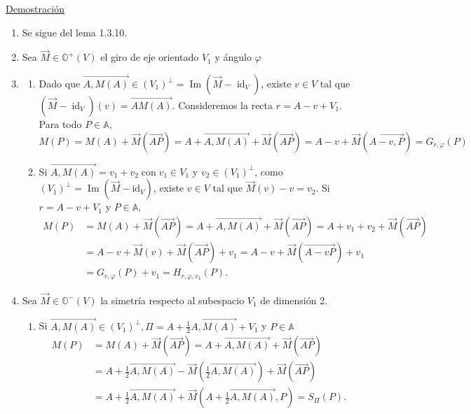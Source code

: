 \documentclass[12pt, a4paper, ones, notitlepage, openany,titlepage]{article}
\newcommand{\demostracion}{\noindent\underline{Demostración}}
\begin{document}
\demostracion
\begin{enumerate}[label=(\arabic*)]
\item Se sigue del lema 1.3.10.

\item Sea $\overrightarrow{M} \in \mathbb{O}^{+}(V)$ el giro de eje orientado $V_{1}$ y ángulo $\varphi$

\item
\begin{enumerate}[label=(\alph*)]
	\item Dado que $\overrightarrow{A, M(A)} \in\left(V_{1}\right)^{\perp}=\operatorname{Im}\left(\overrightarrow{M}-\operatorname{id}_{V}\right)$, existe $v \in V$ tal que $\left(\overrightarrow{M}-\operatorname{id}_{V}\right)(v)=\overrightarrow{A M(A)}$. Consideremos la recta $r=A-v+V_{1}$. Para todo $P \in \mathbb{A}$,
	$$
	M(P)=M(A)+\overrightarrow{M}(\overrightarrow{A P})=A+\overrightarrow{A, M(A)}+\overrightarrow{M}(\overrightarrow{A P})=A-v+\overrightarrow{M}(\overrightarrow{A-v, P})=G_{r, \varphi}(P)
	$$

	\item Si $\overrightarrow{A, M(A)}=v_{1}+v_{2} \operatorname{con} v_{1} \in V_{1}$ y $v_{2} \in\left(V_{1}\right)^{\perp}$, como $\left(V_{1}\right)^{\perp}=\operatorname{Im}\left(\overrightarrow{M}-\mathrm{id}_{V}\right)$, existe $v \in V$ tal que $\overrightarrow{M}(v)-v=v_{2}$. Si $r=A-v+V_{1}$ y $P \in \mathbb{A}$,
	$$
	\begin{aligned}
		M(P) & =M(A)+\overrightarrow{M}(\overrightarrow{A P})=A+\overrightarrow{A, M(A)}+\overrightarrow{M}(\overrightarrow{A P})=A+v_{1}+v_{2}+\overrightarrow{M}(\overrightarrow{A P}) \\
		& =A-v+\overrightarrow{M}(v)+\overrightarrow{M}(\overrightarrow{A P})+v_{1}=A-v+\overrightarrow{M}(\overrightarrow{A-v P})+v_{1} \\
		& =G_{r, \varphi}(P)+v_{1}=H_{r, \varphi, v_{1}}(P) .
	\end{aligned}
	$$
\end{enumerate}

\item Sea $\overrightarrow{M} \in \mathbb{O}^{-}(V)$ la simetría respecto al subespacio $V_{1}$ de dimensión 2.
\begin{enumerate}[label=(\alph*)]
	\item Si $\overrightarrow{A, M(A)} \in\left(V_{1}\right)^{\perp}, \Pi=A+\frac{1}{2} \overrightarrow{A, M(A)}+V_{1}$ y $P \in \mathbb{A}$
	$$
	\begin{aligned}
		M(P) & =M(A)+\overrightarrow{M}(\overrightarrow{A P})=A+\overrightarrow{A, M(A)}+\overrightarrow{M}(\overrightarrow{A P}) \\
		& =A+\frac{1}{2} \overrightarrow{A, M(A)}-\overrightarrow{M}\left(\frac{1}{2} \overrightarrow{A, M(A)}\right)+\overrightarrow{M}(\overrightarrow{A P}) \\
		& =A+\frac{1}{2} \overrightarrow{A, M(A)}+\overrightarrow{M}\left(A+\frac{1}{2} \overrightarrow{A, M(A)}, P\right)=S_{\Pi}(P) .
	\end{aligned}
	$$


\end{enumerate}
\end{enumerate}
\end{document}
